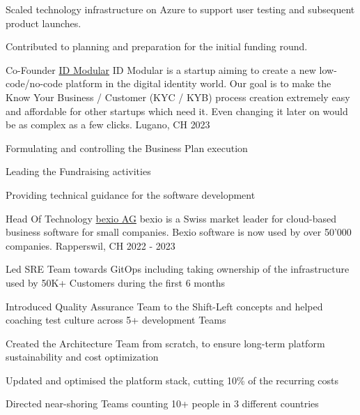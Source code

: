 \begin{cventries}
{\begin{cvitems}
      \item {Scaled technology infrastructure on Azure to support user testing and subsequent product launches.}
      \item {Contributed to planning and preparation for the initial funding round.}
    \end{cvitems}
  }
  \cventry
    {Co-Founder} %
    {\href{https://www.idmodular.com}{ID Modular}} %
    {ID Modular is a startup aiming to create a new low-code/no-code platform in the digital identity world. Our goal is to make the Know Your Business / Customer (KYC / KYB) process creation extremely easy and affordable for other startups which need it. Even changing it later on would be as complex as a few clicks.} %
    {Lugano, CH} %
    {2023} %
    {
      \begin{cvitems} %
        \item {Formulating and controlling the Business Plan execution}
        \item {Leading the Fundraising activities}
        \item {Providing technical guidance for the software development}
      \end{cvitems}
    }
  \cventry
    {Head Of Technology} %
    {\href{https://www.bexio.com}{bexio AG}} %
    {bexio is a Swiss market leader for cloud-based business software for small companies. Bexio software is now used by over 50'000 companies.} %
    {Rapperswil, CH} %
    {2022 - 2023} %
    {
      \begin{cvitems} %
        \item {Led SRE Team towards GitOps including taking ownership of the infrastructure used by 50K+ Customers during the first 6 months}
        \item {Introduced Quality Assurance Team to the Shift-Left concepts and helped coaching test culture across 5+ development Teams}
        \item {Created the Architecture Team from scratch, to ensure long-term platform sustainability and cost optimization}
        \item {Updated and optimised the platform stack, cutting 10\% of the recurring costs}
        \item {Directed near-shoring Teams counting 10+ people in 3 different countries}
      \end{cvitems}
    }


\end{cventries}
